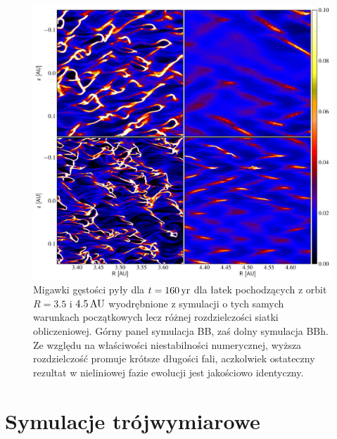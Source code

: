\begin{figure}
   \includegraphics[width=0.98\linewidth]{figures/fig10}
   \caption{Migawki gęstości pyły dla $t = 160\hbox{$\thinspace\textrm{yr}$}$ dla łatek pochodzących z
      orbit $R=3.5$ i $4.5\hbox{$\thinspace\textrm{AU}$}$ wyodrębnione z symulacji o tych samych warunkach
      początkowych lecz różnej rozdzielczości siatki obliczeniowej. Górny panel
      symulacja BB, zaś dolny symulacja BBh. Ze względu na właściwości
      niestabilności numerycznej, wyższa rozdzielczość promuje krótsze długości
      fali, aczkolwiek ostateczny rezultat w nieliniowej fazie ewolucji jest
      jakościowo identyczny.} 
   \label{fig10} 
\end{figure}

\section{Symulacje trójwymiarowe}


